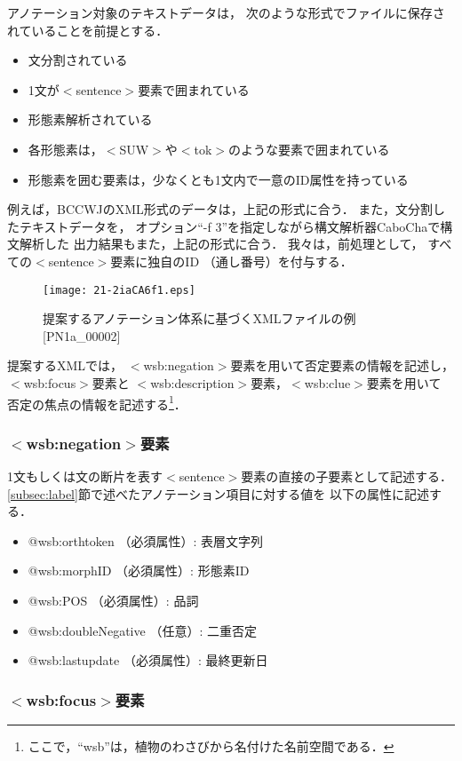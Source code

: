 \documentclass[japanese]{jnlp_1.4}
\begin{document}
アノテーション対象のテキストデータは，
次のような形式でファイルに保存されていることを前提とする．
\begin{itemize}
\item 文分割されている
\item 1文が$<$sentence$>$要素で囲まれている
\item 形態素解析されている
\item 各形態素は，$<$SUW$>$や$<$tok$>$のような要素で囲まれている
\item 形態素を囲む要素は，少なくとも1文内で一意のID属性を持っている
\end{itemize}
例えば，BCCWJのXML形式のデータは，上記の形式に合う．
また，文分割したテキストデータを，
オプション``-f 3''を指定しながら構文解析器CaboChaで構文解析した
出力結果もまた，上記の形式に合う．
我々は，前処理として，
すべての$<$sentence$>$要素に独自のID （通し番号）を付与する．

\begin{figure}[t]
\begin{center}
\texttt{[image: 21-2iaCA6f1.eps]}
\end{center}
\caption{提案するアノテーション体系に基づくXMLファイルの例 [PN1a\_00002]}
\label{fig:XML}
\end{figure}

提案するXMLでは，
$<$wsb:negation$>$要素を用いて否定要素の情報を記述し，
$<$wsb:focus$>$要素と
$<$wsb:description$>$要素，$<$wsb:clue$>$要素を用いて
否定の焦点の情報を記述する\footnote{
ここで，``wsb''は，植物のわさびから名付けた名前空間である．}．


\subsubsection*{$<$wsb:negation$>$要素}

1文もしくは文の断片を表す$<$sentence$>$要素の直接の子要素として記述する．
\ref{subsec:label}節で述べたアノテーション項目に対する値を
以下の属性に記述する．
\begin{itemize}
\item @wsb:orthtoken （必須属性）: 表層文字列
\item @wsb:morphID （必須属性）: 形態素ID
\item @wsb:POS （必須属性）: 品詞
\item @wsb:doubleNegative （任意）: 二重否定
\item @wsb:lastupdate （必須属性）: 最終更新日
\end{itemize}


\subsubsection*{$<$wsb:focus$>$要素}
\end{document}
